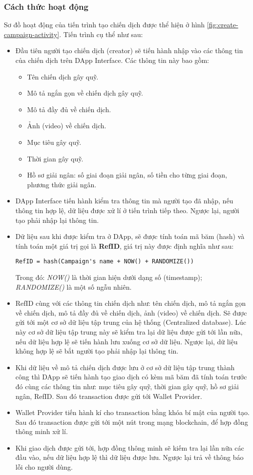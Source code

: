 \documentclass[../main-report.tex]{subfiles}
\begin{document}
\subsubsection{Cách thức hoạt động}
Sơ đồ hoạt động của tiến trình tạo chiến dịch được thể hiện ở hình \ref{fig:create-campaign-activity}. Tiến trình cụ thể như sau:

\begin{itemize}
\item Đầu tiên người tạo chiến dịch (creator) sẽ tiến hành nhập vào các thông tin của chiến dịch trên DApp Interface. Các thông tin này bao gồm: 
\begin{itemize}
\item Tên chiến dịch gây quỹ.
\item Mô tả ngắn gọn về chiến dịch gây quỹ.
\item Mô tả đầy đủ về chiến dịch.
\item Ảnh (video) về chiến dịch.
\item Mục tiêu gây quỹ.
\item Thời gian gây quỹ.
\item Hồ sơ giải ngân: số giai đoạn giải ngân, số tiền cho từng giai đoạn, phương thức giải ngân.
\end{itemize}
\item DApp Interface tiến hành kiểm tra thông tin mà người tạo đã nhập, nếu thông tin hợp lệ, dữ liệu được xử lí ở tiến trình tiếp theo. Ngược lại, người tạo phải nhập lại thông tin.
\item Dữ liệu sau khi được kiểm tra ở DApp, sẽ được tính toán mã băm (hash) và tính toán một giá trị gọi là \textbf{RefID}, giá trị này được định nghĩa như sau:
\begin{lstlisting} 
RefID = hash(Campaign's name + NOW() + RANDOMIZE())
\end{lstlisting}

Trong đó: \textit{NOW()} là thời gian hiện dưới dạng số (timestamp); \textit{RANDOMIZE()} là một số ngẫu nhiên.
\item RefID cùng với các thông tin chiến dịch như: tên chiến dịch, mô tả ngắn gọn về chiến dịch, mô tả đầy đủ về chiến dịch, ảnh (video) về chiến dịch. Sẽ được gửi tới một cơ sở dữ liệu tập trung của hệ thống (Centralized database). Lúc này cơ sở dữ liệu tập trung này sẽ kiểm tra lại dữ liệu được gửi tới lần nữa, nếu dữ liệu hợp lệ sẽ tiến hành lưu xuống cơ sở dữ liệu. Ngược lại, dữ liệu không hợp lệ sẽ bắt người tạo phải nhập lại thông tin.
\item Khi dữ liệu về mô tả chiến dịch được lưu ở cơ sở dữ liệu tập trung thành công thì DApp sẽ tiến hành tạo giao dịch có kèm mã băm đã tính toán trước đó cùng các thông tin như: mục tiêu gây quỹ, thời gian gây quỹ, hồ sơ giải ngân, RefID. Sau đó transaction được gửi tới Wallet Provider.
\item Wallet Provider tiến hành kí cho \gls{transaction} bằng khóa bí mật của người tạo. Sau đó \gls{transaction} được gửi tới một nút trong mạng blockchain, để hợp đồng thông minh xử lí.
\item Khi giao dịch được gửi tới, hợp đồng thông minh sẽ kiếm tra lại lần nữa các đầu vào, nếu dữ liệu hợp lệ thì dữ liệu được lưu. Ngược lại trả về thông báo lỗi cho người dùng.
\end{itemize}
\end{document}
